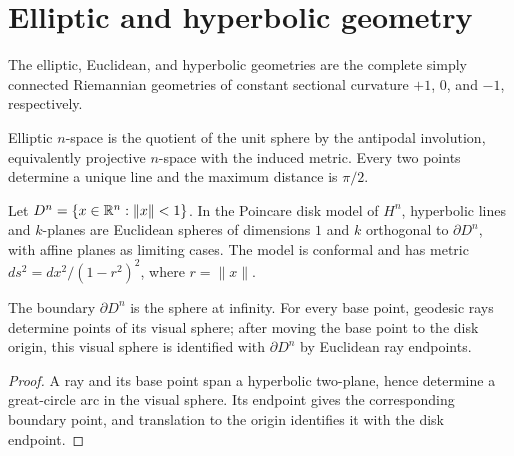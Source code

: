 \chapter{Elliptic and hyperbolic geometry}

\begin{convention}
\label{thurston-ch02-constant-curvature}
The elliptic, Euclidean, and hyperbolic geometries are the complete simply connected Riemannian geometries of constant sectional curvature $+1$, $0$, and $-1$, respectively.
\end{convention}

\begin{definition}
\label{thurston-ch02-elliptic-space}
Elliptic $n$-space is the quotient of the unit sphere by the antipodal involution, equivalently projective $n$-space with the induced metric. Every two points determine a unique line and the maximum distance is $\pi/2$.
\end{definition}

\begin{definition}
\label{thurston-ch02-poincare-disk}
Let $D^n=\{x\in\mathbb{R}^n:\lVert x\rVert<1\}$. In the Poincare disk model of $H^n$, hyperbolic lines and $k$-planes are Euclidean spheres of dimensions $1$ and $k$ orthogonal to $\partial D^n$, with affine planes as limiting cases. The model is conformal and has metric $ds^2=dx^2/(1-r^2)^2$, where $r=\lVert x\rVert$.
\end{definition}

\begin{proposition}
\label{thurston-ch02-sphere-at-infinity}
The boundary $\partial D^n$ is the sphere at infinity. For every base point, geodesic rays determine points of its visual sphere; after moving the base point to the disk origin, this visual sphere is identified with $\partial D^n$ by Euclidean ray endpoints.
\end{proposition}
\begin{proof}\sketch A ray and its base point span a hyperbolic two-plane, hence determine a great-circle arc in the visual sphere. Its endpoint gives the corresponding boundary point, and translation to the origin identifies it with the disk endpoint.\end{proof}

